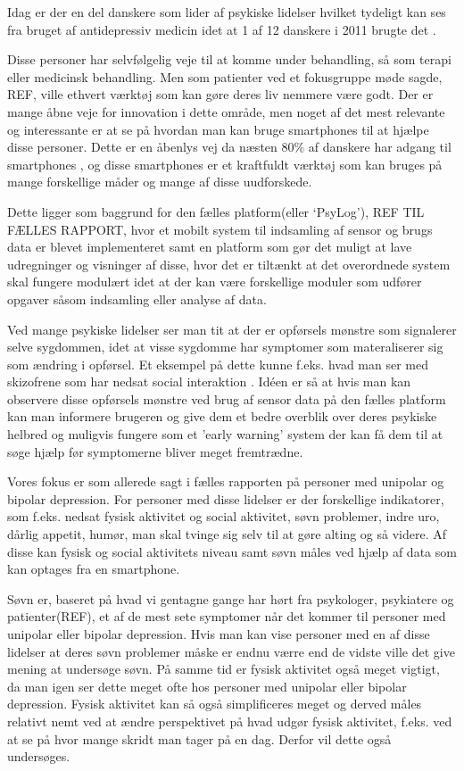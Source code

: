 Idag er der en del danskere som lider af psykiske lidelser hvilket tydeligt kan ses fra bruget af antidepressiv medicin idet at 1 af 12 danskere i 2011 brugte det \citep{misc:forbrugAntidepressiva}. 

Disse personer har selvfølgelig veje til at komme under behandling, så som terapi eller medicinsk behandling.
Men som patienter ved et fokusgruppe møde sagde, REF, ville ethvert værktøj som kan gøre deres liv nemmere være godt.
Der er mange åbne veje for innovation i dette område, men noget af det mest relevante og interessante er at se på hvordan man kan bruge smartphones til at hjælpe disse personer.
Dette er en åbenlys vej da næsten 80\% af danskere har adgang til smartphones \citep{misc:dstElektronik}, og disse smartphones er et kraftfuldt værktøj som kan bruges på mange forskellige måder og mange af disse uudforskede.

Dette ligger som baggrund for den fælles platform(eller `PsyLog'), REF TIL FÆLLES RAPPORT, hvor et mobilt system til indsamling af sensor og brugs data er blevet implementeret samt en platform som gør det muligt at lave udregninger og visninger af disse, hvor det er tiltænkt at det overordnede system skal fungere modulært idet at der kan være forskellige moduler som udfører opgaver såsom indsamling eller analyse af data.

Ved mange psykiske lidelser ser man tit at der er opførsels mønstre som signalerer selve sygdommen, idet at visse sygdomme har symptomer som materaliserer sig som ændring i opførsel.
Et eksempel på dette kunne f.eks. hvad man ser med skizofrene som har nedsat social interaktion \citep{misc:negativeSymptomsSchizo}.
Idéen er så at hvis man kan observere disse opførsels mønstre ved brug af sensor data på den fælles platform kan man informere brugeren og give dem et bedre overblik over deres psykiske helbred og muligvis fungere som et 'early warning' system der kan få dem til at søge hjælp før symptomerne bliver meget fremtrædne.

Vores fokus er som allerede sagt i fælles rapporten på personer med unipolar og bipolar depression. 
For personer med disse lidelser er der forskellige indikatorer, som f.eks. nedsat fysisk aktivitet og social aktivitet, søvn problemer, indre uro, dårlig appetit, humør, man skal tvinge sig selv til at gøre alting og så videre. %
Af disse kan fysisk og social aktivitets niveau samt søvn måles ved hjælp af data som kan optages fra en smartphone.

Søvn er, baseret på hvad vi gentagne gange har hørt fra psykologer, psykiatere og patienter(REF), et af de mest sete symptomer når det kommer til personer med unipolar eller bipolar depression. 
Hvis man kan vise personer med en af disse lidelser at deres søvn problemer måske er endnu værre end de vidste ville det give mening at undersøge søvn. 
På samme tid er fysisk aktivitet også meget vigtigt, da man igen ser dette meget ofte hos personer med unipolar eller bipolar depression.
Fysisk aktivitet kan så også simplificeres meget og derved måles relativt nemt ved at ændre perspektivet på hvad udgør fysisk aktivitet, f.eks. ved at se på hvor mange skridt man tager på en dag.
Derfor vil dette også undersøges.

